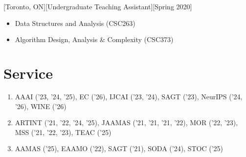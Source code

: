 \documentclass{article}
\begin{document}
    [Toronto, ON][Undergraduate Teaching Assistant][Spring 2020]
    \begin{itemize}
        \item Data Structures and Analysis (CSC263)
        \item Algorithm Design, Analysis \& Complexity (CSC373)
    \end{itemize}
    
    \section{Service}
    \begin{enumerate}[align=left]
    	\item[\textbf{PC Member}:] AAAI ('23, '24, '25), EC ('26), IJCAI ('23, '24), SAGT ('23), NeurIPS ('24, '26), WINE ('26)
    	\item[\textbf{Journal Reviewer}:] ARTINT ('21, '22, '24, '25), JAAMAS ('21, '21, '21, '22), MOR ('22, '23), MSS ('21, '22, '23), TEAC ('25)
    	\item[\textbf{Subreviewer}:] AAMAS ('25), EAAMO ('22), SAGT ('21), SODA ('24), STOC ('25)
    \end{enumerate}
    
\end{document}
